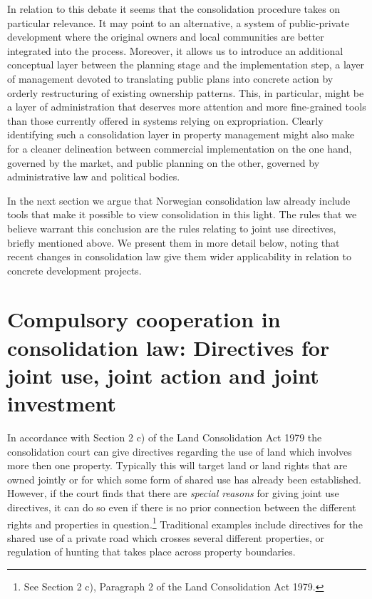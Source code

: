 In relation to this debate it seems that the consolidation procedure takes on particular relevance. It may point to an alternative, a system of public-private development where the original owners and local communities are better integrated into the process. Moreover, it allows us to introduce an additional conceptual layer between the planning stage and the implementation step, a layer of management devoted to translating public plans into concrete action by orderly restructuring of existing ownership patterns. This, in particular, might be a layer of administration that deserves more attention and more fine-grained tools than those currently offered in systems relying on expropriation. Clearly identifying such a consolidation layer in property management might also make for a cleaner delineation between commercial implementation on the one hand, governed by the market, and public planning on the other, governed by administrative law and political bodies. 

In the next section we argue that Norwegian consolidation law already include tools that make it possible to view consolidation in this light. The rules that we believe warrant this conclusion are the rules relating to joint use directives, briefly mentioned above. We present them in more detail below, noting that recent changes in consolidation law give them wider applicability in relation to concrete development projects. 

\section{Compulsory cooperation in consolidation law: Directives for joint use, joint action and joint investment}\label{sec:3}

In accordance with Section 2 c) of the Land Consolidation Act 1979 the consolidation court can give directives regarding the use of land which involves more then one property. Typically this will target land or land rights that are owned jointly or for which some form of shared use has already been established. However, if the court finds that there are \emph{special reasons} for giving joint use directives, it can do so even if there is no prior connection between the different rights and properties in question.\footnote{See Section 2 c), Paragraph 2 of the Land Consolidation Act 1979.} Traditional examples include directives for the shared use of a private road which crosses several different properties, or regulation of hunting that takes place across property boundaries.

